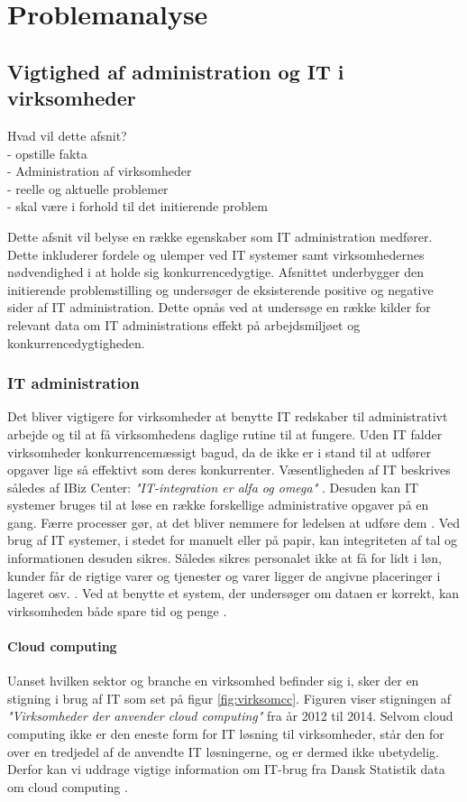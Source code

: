 \chapter{Problemanalyse}\label{ch:analyse}
\section{Vigtighed af administration og IT i virksomheder}
Hvad vil dette afsnit?\\
- opstille fakta\\
    - Administration af virksomheder\\
    - reelle og aktuelle problemer\\
    - skal være i forhold til det initierende problem


Dette afsnit vil belyse en række egenskaber som IT administration medfører. Dette inkluderer fordele og ulemper ved IT systemer samt virksomhedernes nødvendighed i at holde sig konkurrencedygtige. Afsnittet underbygger den initierende problemstilling og undersøger de eksisterende positive og negative sider af IT administration. Dette opnås ved at undersøge en række kilder for relevant data om IT administrations effekt på arbejdsmiljøet og konkurrencedygtigheden.

\subsection{IT administration}
Det bliver vigtigere for virksomheder at benytte IT redskaber til administrativt arbejde og til at få virksomhedens daglige rutine til at fungere. Uden IT falder virksomheder konkurrencemæssigt bagud, da de ikke er i stand til at udfører opgaver lige så effektivt som deres konkurrenter. Væsentligheden af IT beskrives således af IBiz Center: \textit{"IT-integration er alfa og omega"} \citep{case_green_team}. Desuden kan IT systemer bruges til at løse en række forskellige administrative opgaver på en gang. Færre processer gør, at det bliver nemmere for ledelsen at udføre dem \citep{Ibiz_streamline}. Ved brug af IT systemer, i stedet for manuelt eller på papir, kan integriteten af tal og informationen desuden sikres. Således sikres personalet ikke at få for lidt i løn, kunder får de rigtige varer og tjenester og varer ligger de angivne placeringer i lageret osv. \citep{Ibiz_streamline}. Ved at benytte et system, der undersøger om dataen er korrekt, kan virksomheden både spare tid og penge \citep{case_green_team}. 

\subsubsection{Cloud computing}
Uanset hvilken sektor og branche en virksomhed befinder sig i, sker der en stigning i brug af IT som set på figur \ref{fig:virksomcc}. Figuren viser stigningen af \textit{"Virksomheder der anvender cloud computing"} fra år 2012 til 2014. Selvom cloud computing ikke er den eneste form for IT løsning til virksomheder, står den for over en tredjedel af de anvendte IT løsningerne, og er dermed ikke ubetydelig. Derfor kan vi uddrage vigtige information om IT-brug fra Dansk Statistik data om cloud computing \citep{itvirk}.

